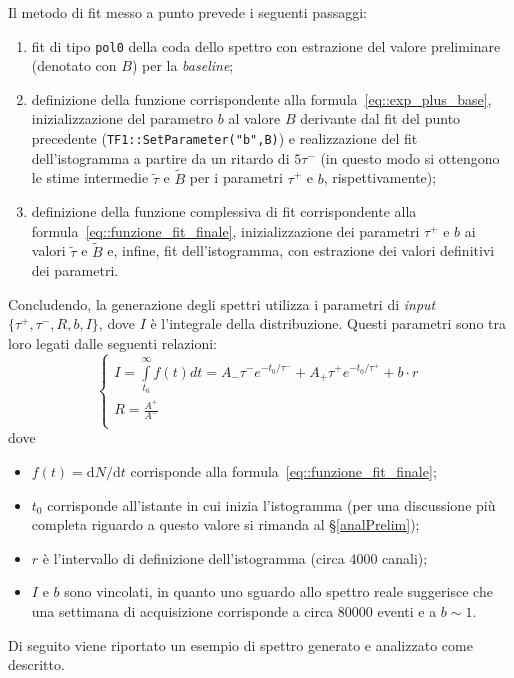 \documentclass[10pt, oneside, a4paper]{article}   	%
\renewcommand{\d}{\mathrm{d}}
\begin{document}
Il metodo di fit messo a punto prevede i seguenti passaggi:
\begin{enumerate}
 \item fit di tipo \lstinline{pol0} della coda dello spettro con estrazione del valore preliminare (denotato con $B$) per la \textit{baseline};
 \item definizione della funzione corrispondente alla formula~\ref{eq::exp_plus_base}, inizializzazione del parametro $b$ al valore $B$ derivante dal fit del punto precedente (\lstinline{TF1::SetParameter("b",B)}) e realizzazione del fit dell'istogramma a partire da un ritardo di $5\tau^-$ (in questo modo si ottengono le stime intermedie $\widetilde{\tau}$  e $\widetilde{B}$ per i parametri $\tau^+$ e $b$, rispettivamente);
 \item definizione della funzione complessiva di fit corrispondente alla formula~\ref{eq::funzione_fit_finale}, inizializzazione dei parametri $\tau^+$ e $b$ ai valori  $\widetilde{\tau}$ e $\widetilde{B}$ e, infine, fit dell'istogramma, con estrazione dei valori definitivi dei parametri. 
%
\end{enumerate}  
Concludendo, la generazione degli spettri utilizza i parametri di \textit{input} $\{\tau^+,\tau^-,R,b,I\}$, dove $I$ è l'integrale della distribuzione. Questi parametri sono tra loro legati dalle seguenti relazioni:
\begin{equation*}
  \begin{cases}
    I = \int\limits_{t_0}^\infty f(t)dt = A_-\tau^-e^{-t_0 / \tau^-} + A_+\tau^+e^{-t_0 / \tau^+} + b\cdot r \\
    R = \frac{A^+}{A^-} \\
  \end{cases}
  \label{eq::condizioni_parametri}
\end{equation*}
dove 
\begin{itemize}
 \item $f(t) = \d N/\d t$ corrisponde alla formula~\ref{eq::funzione_fit_finale};
 \item $t_0$ corrisponde all'istante in cui inizia l'istogramma (per una discussione più completa riguardo a questo valore si rimanda al \S\ref{analPrelim});
 \item $r$ è l'intervallo di definizione dell'istogramma (circa 4000 canali);
 \item $I$ e $b$ sono vincolati, in quanto uno sguardo allo spettro reale suggerisce che una settimana di acquisizione corrisponde a circa 80000 eventi e a $b\sim1 $.
\end{itemize}
Di seguito viene riportato un esempio di spettro generato e analizzato come descritto.
\end{document}
